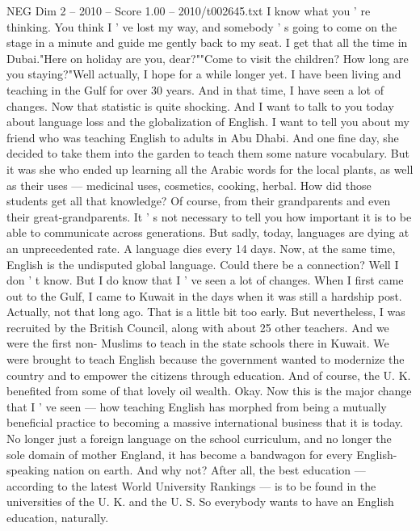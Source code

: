 \begin{textsample}{NEG Dim 2 – 2010 – Score 1.00 – 2010/t002645.txt}  \label{ex:f2_neg_021}
I know what you ' re thinking.
You think I ' ve lost my way, and somebody ' s going to come on the stage in a minute and guide me gently back to my seat.
I get that all the time in Dubai."Here on holiday are you, dear?""Come to visit the children?
How long are you staying?"Well actually, I hope for a while longer yet.
I have been living and teaching in the Gulf for over 30 years.
And in that time, I have seen a lot of changes.
Now that statistic is quite shocking.
And I want to talk to you today about language loss and the globalization of English.
I want to tell you about my friend who was teaching English to adults in Abu Dhabi.
And one fine day, she decided to take them into the garden to teach them some nature vocabulary.
But it was she who ended up learning all the Arabic words for the local plants, as well as their uses — medicinal uses, cosmetics, cooking, herbal.
How did those students get all that knowledge?
Of course, from their grandparents and even their great-grandparents.
It ' s not necessary to tell you how important it is to be able to communicate across generations.
But sadly, today, languages are dying at an unprecedented rate.
A language dies every 14 days.
Now, at the same time, English is the undisputed global language.
Could there be a connection?
Well I don ' t know.
But I do know that I ' ve seen a lot of changes.
When I first came out to the Gulf, I came to Kuwait in the days when it was still a hardship post.
Actually, not that long ago.
That is a little bit too early.
But nevertheless, I was recruited by the British Council, along with about 25 other teachers.
And we were the first non- Muslims to teach in the state schools there in Kuwait.
We were brought to teach English because the government wanted to modernize the country and to empower the citizens through education.
And of course, the U.
K. benefited from some of that lovely oil wealth.
Okay.
Now this is the major change that I ' ve seen — how teaching English has morphed from being a mutually beneficial practice to becoming a massive international business that it is today.
No longer just a foreign language on the school curriculum, and no longer the sole domain of mother England, it has become a bandwagon for every English-speaking nation on earth.
And why not?
After all, the best education — according to the latest World University Rankings — is to be found in the universities of the U.
K. and the U.
S.
So everybody wants to have an English education, naturally.

\end{textsample}
